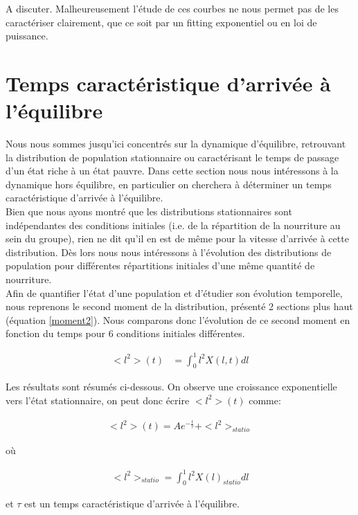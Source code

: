 A discuter. \fixme 
Malheureusement l'étude de ces courbes ne nous permet pas de les caractériser clairement, que ce soit par un fitting exponentiel ou en loi de puissance.


\section{Temps caractéristique d'arrivée à l'équilibre}

Nous nous sommes jusqu'ici concentrés sur la dynamique d'équilibre, retrouvant la distribution de population stationnaire ou caractérisant le temps de passage d'un état riche à un état pauvre. Dans cette section nous nous intéressons à la dynamique hors équilibre, en particulier on cherchera à déterminer un temps caractéristique d'arrivée à l'équilibre.\\

Bien que nous ayons montré que les distributions stationnaires sont indépendantes des conditions initiales (i.e. de la répartition de la nourriture au sein du groupe), rien ne dit qu'il en est de même pour la vitesse d'arrivée à cette distribution. Dès lors nous nous intéressons à l'évolution des distributions de population pour différentes répartitions initiales d'une même quantité de nourriture.\\

Afin de quantifier l'état d'une population et d'étudier son évolution temporelle, nous reprenons le second moment de la distribution, présenté 2 sections plus haut (équation \ref{moment2}). Nous comparons donc l'évolution de ce second moment en fonction du temps pour 6 conditions initiales différentes. 

\begin{equation}
\begin{aligned}
<l^2>(t) &= \int_0^1 l^2 X(l,t) dl 
\end{aligned}
\label{moment2}
\end{equation}


Les résultats sont résumés ci-dessous. On observe une croissance exponentielle vers l'état stationnaire, on peut donc écrire $<l^2>(t)$ comme:

\begin{equation}
\begin{aligned}
<l^2>(t)=A e^{-\frac{t}{\tau}}+<l^2>_{statio}
\end{aligned}
\end{equation}

où

\begin{equation}
\begin{aligned}
<l^2>_{statio}= \int_0^1 l^2 X(l)_{statio} dl
\end{aligned}
\end{equation}

et $\tau$ est un temps caractéristique d'arrivée à l'équilibre.